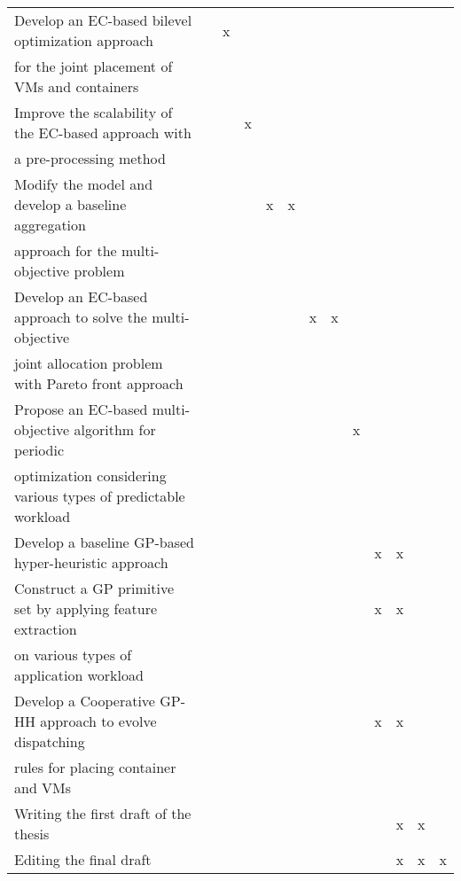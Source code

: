 \begin{table}
\begin{center}
{\begin{tabular}{|l||cccc|cccc|cccc|}
Develop an EC-based bilevel optimization approach & &x&&& & & & & & & &\\ 
for the joint placement of VMs and containers & &&&& & & & & & & &  \\
Improve the scalability of the EC-based approach with & & &x & & & & & & & & & \\
 a pre-processing method & & & & & & & & & & & &   \\ [1mm]
Modify the model and develop a baseline aggregation & & & &x&x& & & & & & & \\ approach for the multi-objective problem & & & &&& & & & & & & \\ [1mm]
Develop an EC-based approach to solve the multi-objective & & & & & &x&x& & & & & \\ joint allocation problem
with Pareto front approach & & & & & &&& & & & &  \\[1mm]
Propose an EC-based multi-objective algorithm for periodic &&&&&&&&x&&&&\\
optimization considering various types of predictable workload &&&&&&&&&&&& \\ [1mm]
Develop a baseline GP-based hyper-heuristic approach &&&&&&&&&x&x&& \\ [1mm]
Construct a GP primitive set by applying feature extraction &&&&&&&&&x&x&&\\ on various types of application workload &&&&&&&&&&&& \\ [1mm]
Develop a Cooperative GP-HH approach to evolve dispatching &&&&&&&&&x&x&&\\ rules for placing container and VMs &&&&&&&&&&&&\\ [1mm]
Writing the first draft of the thesis &&&&&&&&&&x&x&  \\ \hline
 Editing the final draft   &&&&&&&&&&x&x&x \\ \hline

\end{tabular}
}
\end{center}
\end{table}


